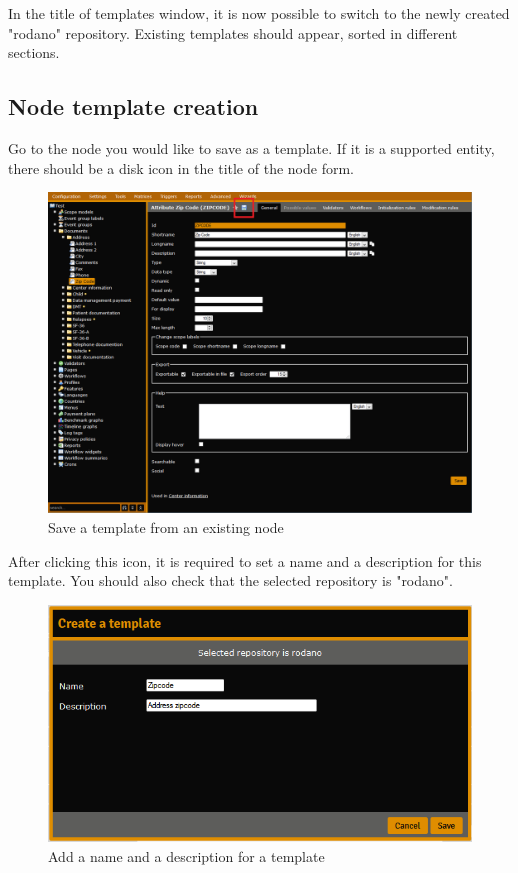 \documentclass[11pt,a4paper,oneside]{article}
\begin{document}
In the title of templates window, it is now possible to switch to the newly created "rodano" repository. Existing templates should appear, sorted in different sections.\\

\subsection{Node template creation}

Go to the node you would like to save as a template. If it is a supported entity, there should be a disk icon in the title of the node form.\\

\begin{figure}[h!]
\caption{Save a template from an existing node}
\includegraphics[width=\linewidth]{node_templates_save_template_1}
\end{figure}

After clicking this icon, it is required to set a name and a description for this template. You should also check that the selected repository is "rodano".\\

\begin{figure}[h!]
\caption{Add a name and a description for a template}
\includegraphics{node_templates_save_template_2}
\end{figure}
\end{document}
